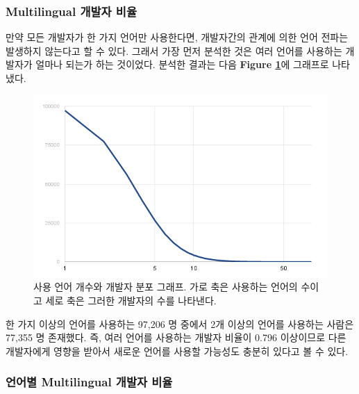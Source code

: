 \documentclass[10pt, a4paper, titlepage]{article}
\begin{document}
\subsubsection{Multilingual 개발자 비율}

만약 모든 개발자가 한 가지 언어만 사용한다면, 개발자간의 관계에 의한 언어 전파는 발생하지 않는다고 할 수 있다. 그래서 가장 먼저 분석한 것은 여러 언어를 사용하는 개발자가 얼마나 되는가 하는 것이었다. 분석한 결과는 다음 {\bf Figure \ref{fig:langnum}}에 그래프로 나타냈다.

\begin{figure}[hb]
\includegraphics[width=\textwidth]{image10}
\caption{사용 언어 개수와 개발자 분포 그래프. 가로 축은 사용하는 언어의 수이고 세로 축은 그러한 개발자의 수를 나타낸다.}
\label{fig:langnum}
\end{figure}

한 가지 이상의 언어를 사용하는 97,206 명 중에서 2개 이상의 언어를 사용하는 사람은 77,355 명 존재했다. 즉, 여러 언어를 사용하는 개발자 비율이 0.796 이상이므로 다른 개발자에게 영향을 받아서 새로운 언어를 사용할 가능성도 충분히 있다고 볼 수 있다.

\FloatBarrier

\subsubsection{언어별 Multilingual 개발자 비율}

\FloatBarrier
\end{document}
